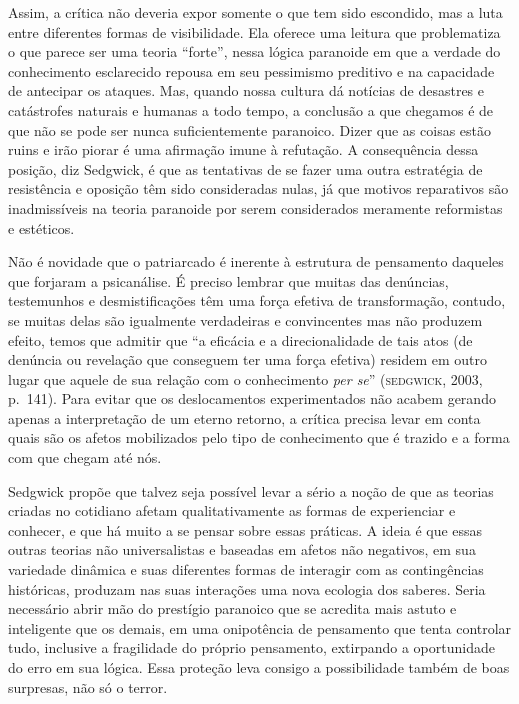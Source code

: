 Assim, a crítica não deveria expor somente o que tem sido escondido, mas
a luta entre diferentes formas de visibilidade. Ela oferece uma leitura
que problematiza o que parece ser uma teoria ``forte'', nessa lógica
paranoide em que a verdade do conhecimento esclarecido repousa em seu
pessimismo preditivo e na capacidade de antecipar os ataques. Mas,
quando nossa cultura dá notícias de desastres e catástrofes naturais e
humanas a todo tempo, a conclusão a que chegamos é de que não se pode
ser nunca suficientemente paranoico. Dizer que as coisas estão ruins e
irão piorar é uma afirmação imune à refutação. A consequência dessa
posição, diz Sedgwick, é que as tentativas de se fazer uma outra
estratégia de resistência e oposição têm sido consideradas nulas, já que
motivos reparativos são inadmissíveis na teoria paranoide por serem
considerados meramente reformistas e estéticos.

Não é novidade que o patriarcado é inerente à estrutura de pensamento
daqueles que forjaram a psicanálise. É preciso lembrar que muitas das
denúncias, testemunhos e desmistificações têm uma força efetiva de
transformação, contudo, se muitas delas são igualmente verdadeiras e
convincentes mas não produzem efeito, temos que admitir que ``a eficácia
e a direcionalidade de tais atos (de denúncia ou revelação que conseguem
ter uma força efetiva) residem em outro lugar que aquele de sua relação
com o conhecimento \emph{per se}'' (\textsc{sedgwick}, 2003, p.~141). Para evitar que os
deslocamentos experimentados não acabem gerando apenas a interpretação
de um eterno retorno, a crítica precisa levar em conta quais são os
afetos mobilizados pelo tipo de conhecimento que é trazido e a forma com
que chegam até nós.

Sedgwick propõe que talvez seja possível levar a sério a noção de que as
teorias criadas no cotidiano afetam qualitativamente as formas de
experienciar e conhecer, e que há muito a se pensar sobre essas
práticas. A ideia é que essas outras teorias não universalistas e
baseadas em afetos não negativos, em sua variedade dinâmica e suas
diferentes formas de interagir com as contingências históricas, produzam
nas suas interações uma nova ecologia dos saberes. Seria necessário
abrir mão do prestígio paranoico que se acredita mais astuto e
inteligente que os demais, em uma onipotência de pensamento que tenta
controlar tudo, inclusive a fragilidade do próprio pensamento,
extirpando a oportunidade do erro em sua lógica. Essa proteção leva
consigo a possibilidade também de boas surpresas, não só o terror.

